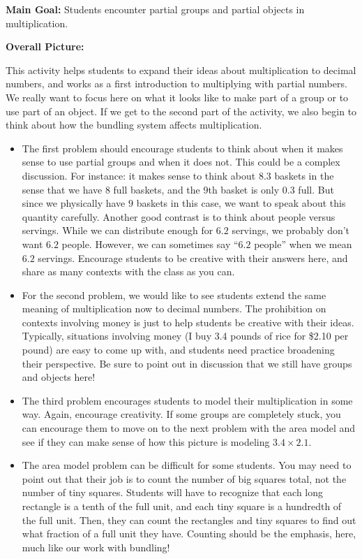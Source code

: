\documentclass{ximera}
\begin{document}
\begin{instructorNotes}

{\bf Main Goal:} Students encounter partial groups and partial objects in multiplication.

{\bf Overall Picture:}

This activity helps students to expand their ideas about multiplication to decimal numbers, and works as a first introduction to multiplying with partial numbers. We really want to focus here on what it looks like to make part of a group or to use part of an object. If we get to the second part of the activity, we also begin to think about how the bundling system affects multiplication.


\begin{itemize}
	\item The first problem should encourage students to think about when it makes sense to use partial groups and when it does not. This could be a complex discussion. For instance: it makes sense to think about $8.3$ baskets in the sense that we have 8 full baskets, and the 9th basket is only $0.3$ full. But since we physically have $9$ baskets in this case, we want to speak about this quantity carefully. Another good contrast is to think about people versus servings. While we can distribute enough for $6.2$ servings, we probably don't want $6.2$ people. However, we can sometimes say ``$6.2$ people'' when we mean $6.2$ servings. Encourage students to be creative with their answers here, and share as many contexts with the class as you can.
	\item For the second problem, we would like to see students extend the same meaning of multiplication now to decimal numbers. The prohibition on contexts involving money is just to help students be creative with their ideas. Typically, situations involving money (I buy 3.4 pounds of rice for \$2.10 per pound) are easy to come up with, and students need practice broadening their perspective. Be sure to point out in discussion that we still have groups and objects here!
	\item The third problem encourages students to model their multiplication in some way. Again, encourage creativity. If some groups are completely stuck, you can encourage them to move on to the next problem with the area model and see if they can make sense of how this picture is modeling $3.4 \times 2.1$.
	\item The area model problem can be difficult for some students. You may need to point out that their job is to count the number of big squares total, not the number of tiny squares. Students will have to recognize that each long rectangle is a tenth of the full unit, and each tiny square is a hundredth of the full unit. Then, they can count the rectangles and tiny squares to find out what fraction of a full unit they have. Counting should be the emphasis, here, much like our work with bundling!

\end{itemize}
\end{instructorNotes}
\end{document}
